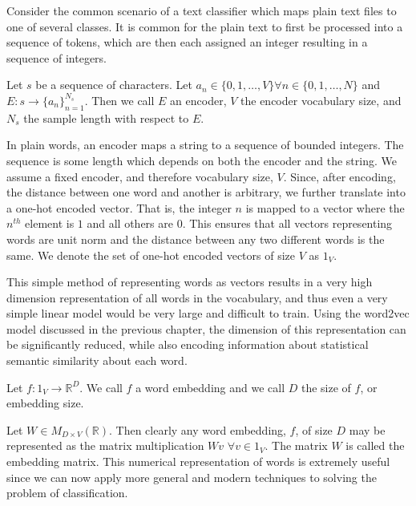 Consider the common scenario of a text classifier which maps plain text files to one of several classes.  It is common for the plain text to first be processed into a sequence of tokens, which are then each assigned an integer resulting in a sequence of integers.

\begin{definition}
Let $s$ be a sequence of characters.  Let $a_n \in \{0,1,\dots,V\} \forall n \in \{0,1,\dots,N\}$ and $E:s\rightarrow \{a_n\}_{n=1}^{N_s}$.  Then we call $E$ an encoder, $V$ the encoder vocabulary size, and $N_s$ the sample length with respect to $E$.
\end{definition}

In plain words, an encoder maps a string to a sequence of bounded integers.  The sequence is some length which depends on both the encoder and the string.  We assume a fixed encoder, and therefore vocabulary size, $V$.  Since, after encoding, the distance between one word and another is arbitrary, we further translate into a one-hot encoded vector.  That is, the integer $n$ is mapped to a vector where the $n^{th}$ element is $1$ and all others are $0$.  This ensures that all vectors representing words are unit norm and the distance between any two different words is the same.  We denote the set of one-hot encoded vectors of size $V$ as $1_V$.

This simple method of representing words as vectors results in a very high dimension representation of all words in the vocabulary, and thus even a very simple linear model would be very large and difficult to train.  Using the word2vec model discussed in the previous chapter, the dimension of this representation can be significantly reduced, while also encoding information about statistical semantic similarity about each word.

\begin{definition}
Let $f: 1_V \rightarrow \mathbb{R}^D$.  We call $f$ a word embedding and we call $D$ the size of $f$, or embedding size.
\end{definition}

\noindent
Let $W \in M_{D\times V}(\mathbb{R})$.  Then clearly any word embedding, $f$, of size $D$ may be represented as the matrix multiplication $Wv$ $\forall v \in 1_V$.  The matrix $W$ is called the embedding matrix.  This numerical representation of words is extremely useful since we can now apply more general and modern techniques to solving the problem of classification.

